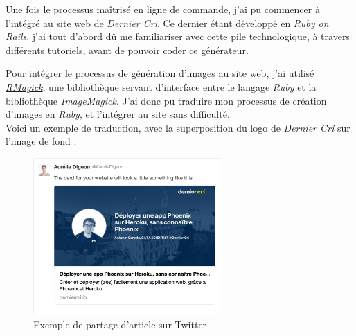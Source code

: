 Une fois le processus maîtrisé en ligne de commande, j'ai pu commencer à
l'intégré au site web de \emph{Dernier Cri}. Ce dernier étant développé
en \emph{Ruby on Rails}, j'ai tout d'abord dû me familiariser avec cette
pile technologique, à travers différents tutoriels, avant de pouvoir
coder ce générateur.

\bigskip

Pour intégrer le processus de génération d'images au site web, j'ai
utilisé \href{https://github.com/rmagick/rmagick}{\emph{RMagick}}, une
bibliothèque servant d'interface entre le langage \emph{Ruby} et la
bibliothèque \emph{ImageMagick}. J'ai donc pu traduire mon processus de
création d'images en \emph{Ruby}, et l'intégrer au site sans
difficulté.\\
Voici un exemple de traduction, avec la superposition du logo de
\emph{Dernier Cri} sur l'image de fond :

\begin{Shaded}
\begin{Highlighting}[]
 \NormalTok{\textbackslash{}}
  \DataTypeTok{\textbackslash{}(}  \DataTypeTok{\textbackslash{})} \NormalTok{\textbackslash{}}
\end{Highlighting}
\end{Shaded}

\begin{Shaded}
\begin{Highlighting}[]
 
  \NormalTok{::}

    \NormalTok{::}\NormalTok{,}
    \NormalTok{,}
    \NormalTok{,}
    \NormalTok{::}
  \NormalTok{)}
\end{Highlighting}
\end{Shaded}

\begin{figure}[h]
  \centering
  \includegraphics[height=6cm]{figures/partage-blog.png}
  \caption{Exemple de partage d'article sur Twitter}
\end{figure}

